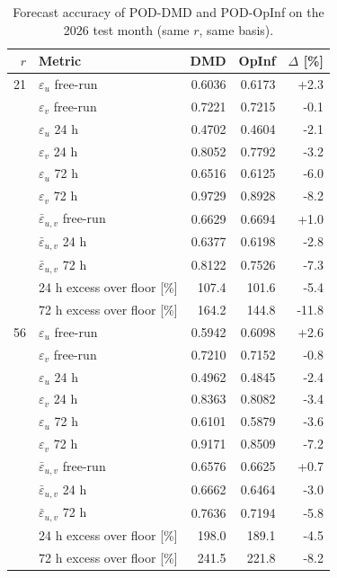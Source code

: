 \begin{table}[t]
\centering
\small
\caption{Forecast accuracy of POD-DMD and POD-OpInf on the 2026 test month (same $r$, same basis).}
\label{tab:rom_acc}
\begin{tabular}{rlrrr}
\toprule
$r$ & Metric & DMD & OpInf & $\Delta$ [\%] \\
\midrule
21 & $\varepsilon_u$ free-run & 0.6036 & 0.6173 & +2.3 \\
 & $\varepsilon_v$ free-run & 0.7221 & 0.7215 & -0.1 \\
 & $\varepsilon_u$ 24 h & 0.4702 & 0.4604 & -2.1 \\
 & $\varepsilon_v$ 24 h & 0.8052 & 0.7792 & -3.2 \\
 & $\varepsilon_u$ 72 h & 0.6516 & 0.6125 & -6.0 \\
 & $\varepsilon_v$ 72 h & 0.9729 & 0.8928 & -8.2 \\
 & $\bar\varepsilon_{u,v}$ free-run & 0.6629 & 0.6694 & +1.0 \\
 & $\bar\varepsilon_{u,v}$ 24 h & 0.6377 & 0.6198 & -2.8 \\
 & $\bar\varepsilon_{u,v}$ 72 h & 0.8122 & 0.7526 & -7.3 \\
 & 24 h excess over floor [\%] & 107.4 & 101.6 & -5.4 \\
 & 72 h excess over floor [\%] & 164.2 & 144.8 & -11.8 \\
\midrule
56 & $\varepsilon_u$ free-run & 0.5942 & 0.6098 & +2.6 \\
 & $\varepsilon_v$ free-run & 0.7210 & 0.7152 & -0.8 \\
 & $\varepsilon_u$ 24 h & 0.4962 & 0.4845 & -2.4 \\
 & $\varepsilon_v$ 24 h & 0.8363 & 0.8082 & -3.4 \\
 & $\varepsilon_u$ 72 h & 0.6101 & 0.5879 & -3.6 \\
 & $\varepsilon_v$ 72 h & 0.9171 & 0.8509 & -7.2 \\
 & $\bar\varepsilon_{u,v}$ free-run & 0.6576 & 0.6625 & +0.7 \\
 & $\bar\varepsilon_{u,v}$ 24 h & 0.6662 & 0.6464 & -3.0 \\
 & $\bar\varepsilon_{u,v}$ 72 h & 0.7636 & 0.7194 & -5.8 \\
 & 24 h excess over floor [\%] & 198.0 & 189.1 & -4.5 \\
 & 72 h excess over floor [\%] & 241.5 & 221.8 & -8.2 \\

\end{tabular}
\end{table}
